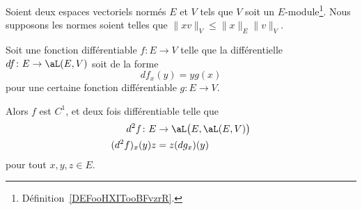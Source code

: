 \begin{lemma}        \label{LEMooHKQVooQTrHHW}
	Soient deux espaces vectoriels normés \( E\) et \( V\) tels que \( V\) soit un \( E\)-module\footnote{Définition~\ref{DEFooHXITooBFvzrR}.}. Nous supposons les normes soient telles que \( \| xv \|_{V}\leq \| x \|_E\| v \|_V\).

	Soit une fonction différentiable \( f\colon E\to V\) telle que la différentielle \( df\colon E\to \aL(E,V)\) soit de la forme
	\begin{equation}
		df_x(y)=yg(x)
	\end{equation}
	pour une certaine fonction différentiable \( g\colon E\to V\).

	Alors \( f\) est \( C^1\), et deux fois différentiable telle que
	\begin{equation}
		\begin{aligned}
			d^2f\colon E & \to \aL\big( E,\aL(E,V) \big) \\
			(d^2f)_x(y)z & =z(dg_x)(y)
		\end{aligned}
	\end{equation}
	pour tout \( x,y,z\in E\).
\end{lemma}

